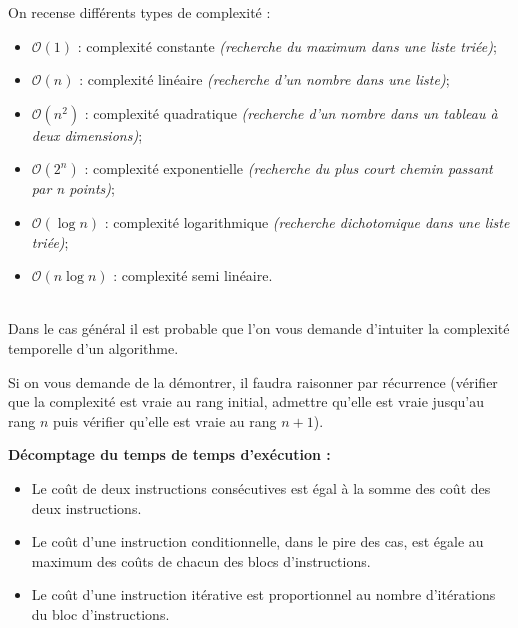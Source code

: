 \documentclass[10pt,fleqn]{article} %
\begin{document}
\begin{exemple}
On recense différents types de complexité :
\begin{itemize}[label=,font=\color{ocre}] 
\item $\mathcal{O}(1)$ : complexité constante \textit{(recherche du maximum dans une liste triée)};
\item $\mathcal{O}(n)$ : complexité linéaire \textit{(recherche d'un nombre dans une liste)};
\item $\mathcal{O}(n^2)$ : complexité quadratique \textit{(recherche d'un nombre dans un tableau à deux dimensions)};
\item $\mathcal{O}(2^n)$ : complexité exponentielle \textit{(recherche du plus court chemin passant par n points)};
\item $\mathcal{O}(\log n)$ : complexité logarithmique \textit{(recherche dichotomique dans une liste triée)};
\item $\mathcal{O}(n \log n)$ : complexité semi linéaire.
\end{itemize}
\end{exemple}
\begin{methode}
~\\
Dans le cas général il est probable que l'on vous demande d'intuiter la complexité temporelle d'un algorithme. 

Si on vous demande de la démontrer, il faudra raisonner par récurrence (vérifier que la complexité est vraie au rang initial, admettre qu'elle est vraie jusqu'au rang $n$ puis vérifier qu'elle est vraie au rang $n+1$). 
\end{methode}

\begin{methode}
\textbf{Décomptage du temps de temps d'exécution :}
\begin{itemize}[label=,font=\color{ocre}] 
\item Le coût de deux instructions consécutives est égal à la somme des coût des deux instructions. 
\item Le coût d'une instruction conditionnelle, dans le pire des cas, est égale au maximum des coûts de chacun des blocs d'instructions.
\item Le coût d'une instruction itérative est proportionnel au nombre d'itérations du bloc d'instructions.
\end{itemize}
\end{methode}
\end{document}
